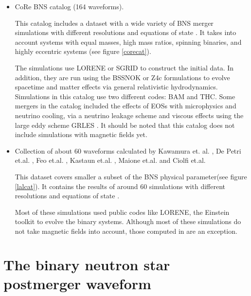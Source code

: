 \begin{itemize}

\item CoRe BNS catalog (164 waveforms).

This catalog includes a dataset with a wide variety of BNS merger simulations with different resolutions and equations of state \cite{Banik_2014,Steiner:2012rk,PhysRevD.79.124032}. It takes into account systems with equal masses, high mass ratios, spinning binaries, and highly eccentric systems (see figure \ref{corecat}).

The simulations use LORENE or SGRID to construct the initial data. In addition, they are run using the BSSNOK \cite{PhysRevD.52.5428,1987PThPS..90....1N,Bernuzzi_2010} or Z4c \cite{Ruiz_2011,Weyhausen_2012,Hilditch_2013} formulations to evolve spacetime and matter effects via general relativistic hydrodynamics. Simulations in this catalog use two different codes: BAM and THC. Some mergers in the catalog included the effects of EOSs with microphysics and neutrino cooling, via a neutrino leakage scheme and viscous effects using the large eddy scheme GRLES \cite{Radice_2017}. It should be noted that this catalog does not include simulations with magnetic fields yet.

\item Collection of about 60 waveforms calculated by Kawamura et. al. \cite{Kawamura:2016nmk}, De Petri et.al. \cite{DePietri:2018tpx,DePietri:2015lya}, Feo et.al. \cite{Feo:2016cbs}, Kastaun et.al. \cite{Kastaun:2016elu}, Maione et.al. \cite{Maione:2016zqz,Maione:2017aux} and Ciolfi et.al. \cite{Ciolfi:2017uak}

This dataset covers smaller a subset of the BNS physical parameter(see figure \ref{lalcat}). It contains the results of around 60 simulations with different resolutions and equations of state \cite{PhysRevC.82.015806,PhysRevC.83.035802,PhysRevC.58.1804,PhysRevD.79.124032,PhysRevLett.67.2414,PhysRevC.52.2072}.

Most of these simulations used public codes like LORENE, the Einstein toolkit to evolve the binary systems.  Although most of these simulations do not take magnetic fields into account, those computed in \cite{Kawamura:2016nmk,Ciolfi:2017uak} are an exception. 

\end{itemize}



\section{The binary neutron star postmerger waveform}

